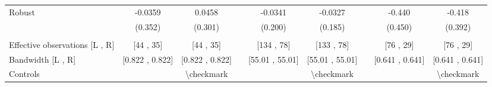 \begin{tabular}{lcccccccc}
Robust & -0.0359 & 0.0458 &       & -0.0341 & -0.0327 &       & -0.440 & -0.418 \\
      & (0.352) & (0.301) &       & (0.200) & (0.185) &       & (0.450) & (0.392) \\
      &       &       &       &       &       &       &       &  \\
\midrule
Effective observations [L , R] & [44 ,  35] & [44 ,  35] &       & [134 ,  78] & [133 ,  78] &       & [76 ,  29] & [76 ,  29] \\
Bandwidth [L , R] & [0.822 ,  0.822] & [0.822 ,  0.822] &       & [55.01 ,  55.01] & [55.01 ,  55.01] &       & [0.641 ,  0.641] & [0.641 ,  0.641] \\
Controls &       & \textbackslash{}checkmark &       &       & \textbackslash{}checkmark &       &       & \textbackslash{}checkmark \\
\bottomrule
\bottomrule
\end{tabular}%
